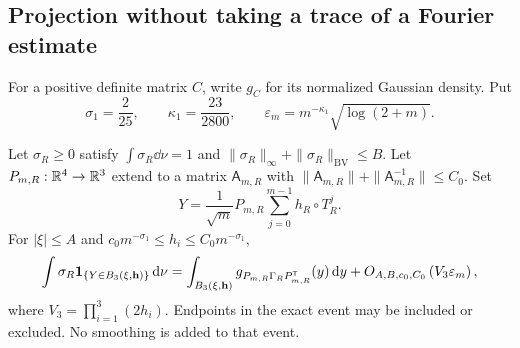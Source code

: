 \subsection{Projection without taking a trace of a Fourier estimate}
For a positive definite matrix $C$, write $g_C$ for its normalized
Gaussian density. Put
\begin{equation}\label{eq:stationary-window-exponents}
 \sigma_1=\frac2{25},\qquad
 \kappa_1=\frac{23}{2800},\qquad
 \varepsilon_m=m^{-\kappa_1}\sqrt{\log(2+m)}.
\end{equation}

\begin{theorem}
\label{thm:projected-collision-windows}
Let $\sigma_R\ge0$ satisfy $\int\sigma_R\dd\nu=1$ and
$\|\sigma_R\|_\infty+\|\sigma_R\|_{\mathrm{BV}}\le B$.
Let $P_{m,R}:\mathbb R^4\to\mathbb R^3$ extend to a matrix $\mathsf A_{m,R}$ with
$\|\mathsf A_{m,R}\|+\|\mathsf A_{m,R}^{-1}\|\le C_0$. Set
\[
 Y=\frac1{\sqrt m}P_{m,R}\sum_{j=0}^{m-1}h_R\circ T_R^j.
\]
For $|\xi|\le A$ and $c_0m^{-\sigma_1}\le h_i\le C_0m^{-\sigma_1}$,
\begin{align}
 \int\sigma_R\one_{\{Y\in B_3(\xi,\mathbf h)\}}\dd\nu
 =\int_{B_3(\xi,\mathbf h)}
       g_{P_{m,R}\Gamma_RP_{m,R}^{\mathsf T}}(y)\dd y
       +O_{A,B,c_0,C_0}\left(V_3\varepsilon_m\right),
 \label{eq:projected-collision-windows}
\end{align}
where $V_3=\prod_{i=1}^3(2h_i)$. Endpoints in the exact event may
be included or excluded. No smoothing is added to that event.
\end{theorem}
